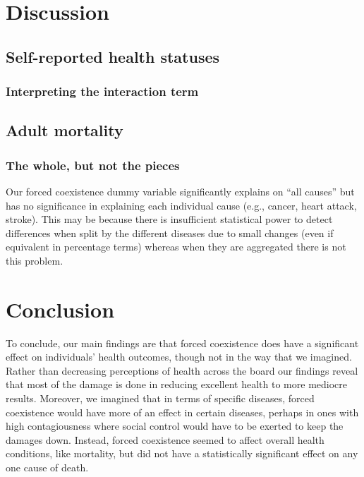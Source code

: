 \documentclass[12pt]{article}
\begin{document}
\section{Discussion}
\subsection{Self-reported health statuses}
\subsubsection{Interpreting the interaction term}

\subsection{Adult mortality}
\subsubsection{The whole, but not the pieces}
Our forced coexistence dummy variable significantly explains on ``all causes'' but has no significance in explaining each individual cause (e.g., cancer, heart attack, stroke). 
This may be because there is insufficient statistical power to detect differences when split by the different diseases due to small changes (even if equivalent in percentage terms) whereas when they are aggregated there is not this problem. 

\section{Conclusion}
To conclude, our main findings are that forced coexistence does have a significant effect on individuals’ health outcomes, though not in the way that we imagined.  
Rather than decreasing perceptions of health across the board our findings reveal that most of the damage is done in reducing excellent health to more mediocre results.  
Moreover, we imagined that in terms of specific diseases, forced coexistence would have more of an effect in certain diseases, perhaps in ones with high contagiousness where social control would have to be exerted to keep the damages down.  
Instead, forced coexistence seemed to affect overall health conditions, like mortality, but did not have a statistically significant effect on any one cause of death.
\end{document}
